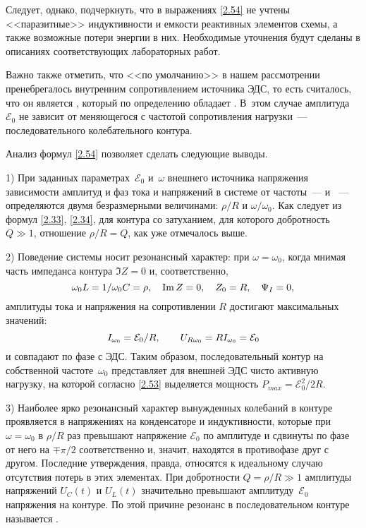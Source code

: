 Следует, однако, подчеркнуть, что в выражениях \eqref{2.54} не учтены
<<паразитные>> индуктивности и емкости реактивных элементов схемы, а также
возможные потери энергии в них. Необходимые уточнения будут сделаны в описаниях
соответствующих лабораторных работ.

Важно также отметить, что <<по умолчанию>> в нашем рассмотрении пренебрегалось
внутренним сопротивлением источника ЭДС, то есть считалось, что он является
, который по определению обладает
. В~этом случае амплитуда
$\mathcal{E}_0$ не зависит от меняющегося с частотой сопротивления
нагрузки~--- последовательного колебательного контура.

Анализ формул \eqref{2.54} позволяет сделать следующие выводы.

1) При заданных параметрах~$\mathcal{E}_0$ и~$\omega$ внешнего источника
напряжения зависимости амплитуд и фаз тока и напряжений в системе от
частоты~---  и ~--- определяются двумя безразмерными величинами: $\rho/R$ и
$\omega/\omega_0$. Как следует из формул \eqref{2.33}, \eqref{2.34}, для контура
со  затуханием, для которого добротность $Q\gg1$, отношение
$\rho/R=Q$, как уже отмечалось выше.

2) Поведение системы носит резонансный характер: при $\omega=\omega_0$, когда
мнимая часть импеданса контура $\Im Z=0$ и, соответственно,
\begin{equation}\eqmark{2.55}
	\omega_0L=1/\omega_0C=\rho, \quad \Im Z=0, \quad Z_0 = R, \quad \Psi_I = 0,
\end{equation}
амплитуды тока и напряжения на сопротивлении $R$ достигают максимальных значений:
\begin{equation}\eqmark{2.56}
	I_{\omega_0}=\mathcal{E}_0/R, \qquad
U_{R\omega_0}=RI_{\omega_0}=\mathcal{E}_0
\end{equation}
и совпадают по фазе с ЭДС. Таким образом, последовательный
контур на собственной частоте~$\omega_0$ представляет для внешней ЭДС чисто
активную нагрузку, на которой согласно \eqref{2.53} выделяется мощность
$P_{max}=\mathcal{E}_0^2/2R$.

3) Наиболее ярко резонансный характер вынужденных колебаний в
 контуре проявляется в напряжениях на конденсаторе и
индуктивности, которые при $\omega=\omega_0$ в $\rho/R$ раз превышают напряжение
$\mathcal{E}_0$ по амплитуде и сдвинуты по фазе от него на $\mp\pi/2$
соответственно и, значит, находятся в противофазе друг с другом. Последние
утверждения, правда, относятся к идеальному случаю отсутствия потерь в этих
элементах. При добротности $Q=\rho/R\gg1$ амплитуды напряжений $U_C(t)$ и
$U_L(t)$ значительно превышают амплитуду~$\mathcal{E}_0$ напряжения на контуре.
По этой причине резонанс в последовательном контуре называется
.

